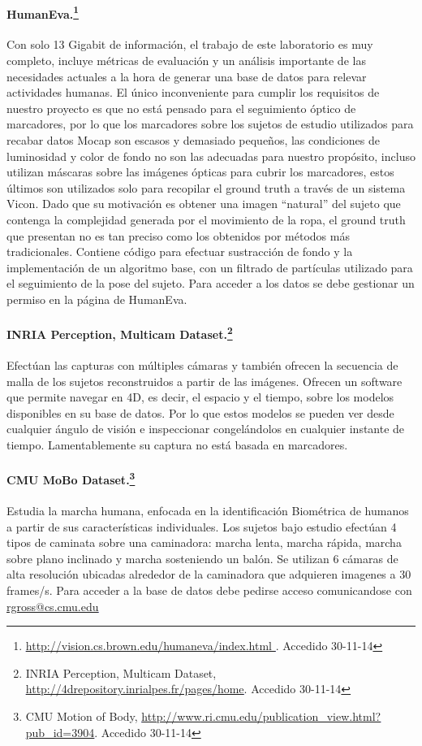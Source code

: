 \paragraph{HumanEva.\footnote{\textcolor{blue}{\underline{\url{http://vision.cs.brown.edu/humaneva/index.html }}}. Accedido 30-11-14} \cite{humaneva} }
Con solo 13 Gigabit de información, el trabajo de este laboratorio es muy completo, incluye métricas de evaluación y un análisis importante de las necesidades actuales a la hora de generar una base de datos para relevar actividades humanas. El único inconveniente para cumplir los requisitos de nuestro proyecto es que no está pensado para el seguimiento óptico de marcadores, por lo que los marcadores sobre los sujetos de estudio utilizados para recabar datos Mocap son escasos y demasiado pequeños, las condiciones de luminosidad y color de fondo no son las adecuadas para nuestro propósito, incluso utilizan máscaras sobre las imágenes ópticas para cubrir los marcadores, estos últimos son utilizados solo para recopilar el ground truth a través de un sistema Vicon.  Dado que su motivación es obtener una imagen ``natural'' del sujeto que contenga la complejidad generada por el movimiento de la ropa, el ground truth que presentan  no es tan preciso como los obtenidos por métodos más tradicionales.  Contiene código para efectuar sustracción de fondo y la implementación de un algoritmo base, con un filtrado de partículas utilizado para el seguimiento de la pose del sujeto. Para acceder a los datos se debe gestionar un permiso en la página de HumanEva. 

\paragraph{INRIA Perception, Multicam Dataset.\footnote{INRIA Perception, Multicam Dataset, \textcolor{blue}{\underline{\url{http://4drepository.inrialpes.fr/pages/home}}}. Accedido 30-11-14}} Efectúan las capturas con múltiples cámaras y también ofrecen la secuencia de malla de los sujetos reconstruidos a partir de las imágenes. Ofrecen un software que permite navegar en 4D, es decir, el espacio y el tiempo, sobre los modelos disponibles en su base de datos. Por lo que estos modelos se pueden ver desde cualquier ángulo de visión e inspeccionar congelándolos en cualquier instante de tiempo. Lamentablemente su captura no está basada en marcadores. 

\paragraph{CMU MoBo Dataset.\footnote{CMU Motion of Body,  \textcolor{blue}{\underline{\url{http://www.ri.cmu.edu/publication_view.html?pub_id=3904}}}. Accedido 30-11-14}}
Estudia la marcha humana, enfocada en la identificación Biométrica de humanos a partir de sus características individuales. Los sujetos bajo estudio efectúan 4 tipos de caminata sobre una caminadora: marcha lenta, marcha rápida, marcha sobre plano inclinado y marcha sosteniendo un balón. Se utilizan 6 cámaras de alta resolución ubicadas alrededor de la caminadora que adquieren imagenes a 30 frames/s. Para acceder a la base de datos debe pedirse acceso comunicandose con \textcolor{blue}{\underline{\url{rgross@cs.cmu.edu }}}

